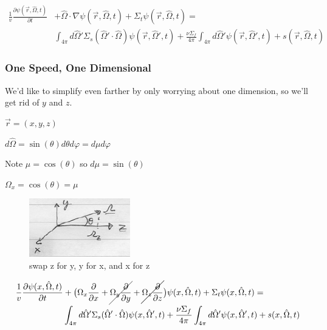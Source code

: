 \documentclass[12pt]{article}
\newcommand{\vOmega}{\ensuremath{\hat{\Omega}}}
\begin{document}
\begin{align}
\frac{1}{v}\frac{\partial \psi(\vec{r}, \vOmega, t)}{\partial t} &+ 
\vOmega \cdot \nabla \psi(\vec{r}, \vOmega, t) +
\Sigma_t \psi(\vec{r}, \vOmega, t) = \nonumber\\
%
& \int_{4\pi} d\vOmega' \Sigma_s(\vOmega' \cdot \vOmega) \psi(\vec{r}, \vOmega', t)  
+ \frac{\nu \Sigma_f}{4\pi} \int_{4\pi} d\vOmega' \psi(\vec{r},  \vOmega', t) 
+ s(\vec{r}, \vOmega, t) 
\end{align}
%



\subsubsection{One Speed, One Dimensional}

We'd like to simplify even farther by only worrying about one dimension, so we'll get rid of $y$ and $z$.

\begin{minipage}{0.5\textwidth}
$\vec{r} = (x, y, z)$

$d\vOmega = \sin(\theta) d\theta	d\varphi = d\mu d\varphi$

Note $\mu = \cos(\theta)$ so $d\mu = \sin(\theta)$

$\Omega_x = \cos(\theta) = \mu$
\end{minipage} \hfill
\begin{minipage}{0.45\textwidth}
\begin{figure}[H]
\includegraphics[height=1in]{1Dspace}
\caption{swap z for y, y for x, and x for z}
\end{figure}
\end{minipage}

\begin{align}
\frac{1}{v}\frac{\partial \psi(x, \vOmega, t)}{\partial t} &+ 
\bigl(\Omega_x \frac{\partial}{\partial x} + \cancel{\Omega_y \frac{\partial}{\partial y}} + \cancel{\Omega_z \frac{\partial}{\partial z}} \bigr)\psi(x, \vOmega, t) +
\Sigma_t \psi(x, \vOmega, t) = \nonumber\\
%
& \int_{4\pi} d\vOmega' \Sigma_s(\vOmega' \cdot \vOmega) \psi(x, \vOmega', t)  + 
\frac{\nu \Sigma_f}{4\pi} \int_{4\pi} d\vOmega' \psi(x,  \vOmega', t) + s(x, \vOmega, t)%
\end{align}
\end{document}
